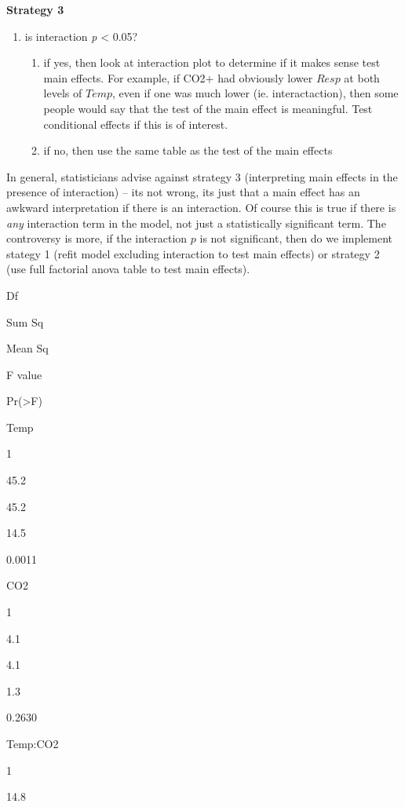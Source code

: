 \documentclass[]{book}
\providecommand{\tightlist}{%
  \setlength{\itemsep}{0pt}\setlength{\parskip}{0pt}}
\begin{document}
\textbf{Strategy 3}

\begin{enumerate}
\def\labelenumi{\arabic{enumi}.}
\setcounter{enumi}{2}
\tightlist
\item
  is interaction \emph{p} \textless{} 0.05?

  \begin{enumerate}
  \def\labelenumii{\alph{enumii}.}
  \tightlist
  \item
    if yes, then look at interaction plot to determine if it makes sense test main effects. For example, if CO2+ had obviously lower \(Resp\) at both levels of \(Temp\), even if one was much lower (ie. interactaction), then some people would say that the test of the main effect is meaningful. Test conditional effects if this is of interest.
  \item
    if no, then use the same table as the test of the main effects
  \end{enumerate}
\end{enumerate}

In general, statisticians advise against strategy 3 (interpreting main effects in the presence of interaction) -- its not wrong, its just that a main effect has an awkward interpretation if there is an interaction. Of course this is true if there is \emph{any} interaction term in the model, not just a statistically significant term. The controversy is more, if the interaction \(p\) is not significant, then do we implement stategy 1 (refit model excluding interaction to test main effects) or strategy 2 (use full factorial anova table to test main effects).

Df

Sum Sq

Mean Sq

F value

Pr(\textgreater F)

Temp

1

45.2

45.2

14.5

0.0011

CO2

1

4.1

4.1

1.3

0.2630

Temp:CO2

1

14.8
\end{document}
